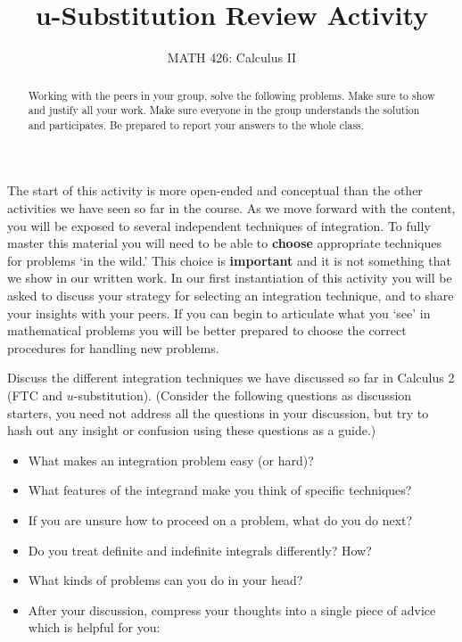 \documentclass{ximera}
\title{u-Substitution Review Activity}
\author{MATH 426: Calculus II}
\begin{document}
\begin{abstract}
   Working with the peers in your group, solve the following problems. Make sure to show and justify all your work. Make sure everyone in the group understands the solution and participates. Be prepared to report your answers to the whole class. 
\end{abstract}
\maketitle

The start of this activity is more open-ended and conceptual than the other activities we have seen so far in the course. As we move forward with the content, you will be exposed to several independent techniques of integration. To fully master this material you will need to be able to \textbf{choose} appropriate techniques for problems `in the wild.' This choice is \textbf{important} and it is not something that we show in our written work. In our first instantiation of this activity you will be asked to discuss your strategy for selecting an integration technique, and to share your insights with your peers. If you can begin to articulate what you `see' in mathematical problems you will be better prepared to choose the correct procedures for handling new problems.\\


\begin{exercise}
    Discuss the different integration techniques we have discussed so far in Calculus 2 (FTC and $u$-substitution). (Consider the following questions as discussion starters, you need not address all the questions in your discussion, but try to hash out any insight or confusion using these questions as a guide.)

    \begin{itemize}
        \item What makes an integration problem easy (or hard)?

        \item What features of the integrand make you think of specific techniques?

        \item If you are unsure how to proceed on a problem, what do you do next?

        \item Do you treat definite and indefinite integrals differently? How?

        \item What kinds of problems can you do in your head?
        
        \item After your discussion, compress your thoughts into a single piece of advice which is helpful for you:
    \end{itemize}
\end{exercise}
\end{document}

